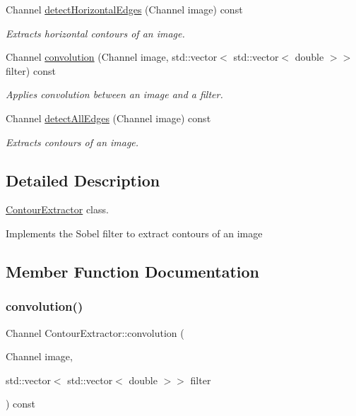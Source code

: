 \begin{DoxyCompactItemize}
Channel \hyperlink{class_contour_extractor_af99fc045e0745f2b4244ad43822a7a1d}{detect\+Horizontal\+Edges} (Channel image) const
\begin{DoxyCompactList}\small\item\em Extracts horizontal contours of an image. \end{DoxyCompactList}\item 
Channel \hyperlink{class_contour_extractor_a4a8d3597e99dcc90a62cb493bed0795d}{convolution} (Channel image, std\+::vector$<$ std\+::vector$<$ double $>$$>$ filter) const
\begin{DoxyCompactList}\small\item\em Applies convolution between an image and a filter. \end{DoxyCompactList}\item 
Channel \hyperlink{class_contour_extractor_a0f85a3798530781e5c20b845df1677eb}{detect\+All\+Edges} (Channel image) const
\begin{DoxyCompactList}\small\item\em Extracts contours of an image. \end{DoxyCompactList}\end{DoxyCompactItemize}


\subsection{Detailed Description}
\hyperlink{class_contour_extractor}{Contour\+Extractor} class. 

Implements the Sobel filter to extract contours of an image 

\subsection{Member Function Documentation}
\mbox{\label{class_contour_extractor_a4a8d3597e99dcc90a62cb493bed0795d}} 
\subsubsection{\texorpdfstring{convolution()}{convolution()}}
{\footnotesize\ttfamily Channel Contour\+Extractor\+::convolution (\begin{DoxyParamCaption}\item[{Channel}]{image,  }\item[{std\+::vector$<$ std\+::vector$<$ double $>$$>$}]{filter }\end{DoxyParamCaption}) const}



